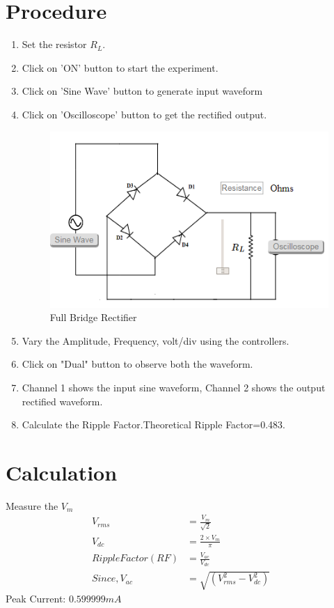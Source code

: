 	\section{Procedure}
		\begin{enumerate}
			\item Set the resistor \(R_L\).
			\item Click on 'ON' button to start the experiment.
			\item Click on 'Sine Wave' button to generate input waveform
			\item Click on 'Oscilloscope' button to get the rectified output.
			\begin{figure}[h]
				\centering
				\includegraphics[width=0.5\linewidth]{img/exp7/17}
				\caption{Full Bridge Rectifier}
				\label{fig:fwr_procedure}
			\end{figure}
			\item Vary the Amplitude, Frequency, volt/div using the controllers.
			\item Click on "Dual" button to observe both the waveform.
			\item Channel 1 shows the input sine waveform, Channel 2 shows the output rectified waveform.
			\item Calculate the Ripple Factor.Theoretical Ripple Factor=0.483.
		\end{enumerate}
	
	\section{Calculation}
		 Measure the $V_m$
		 \begin{align*}
			V_{rms} &= \frac{V_m}{\sqrt{2}}\\	
			V_{dc} &= \frac{2 \times V_m} {\pi}\\
			Ripple Factor (RF) &=\frac{V_{ac}}{V_{dc}}\\
			Since, V_{ac} &=\sqrt{(V^2_{rms}-V^2_{dc})}
		 \end{align*}
	 	Peak Current: $0.599999 mA$
	 
